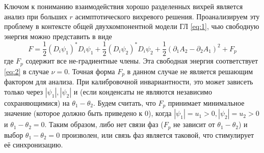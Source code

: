 Ключом к пониманию взаимодействия хорошо разделенных вихрей является анализ 
при больших \( r \) асимптотического вихревого решения. Проанализируем эту 
проблему в контексте общей двухкомпонентной модели ГЛ \eqref{eq:1}, чью 
свободную энергия можно представить в виде
\begin{equation}
    F = \frac{1}{2}\left( D_i \psi_1 \right)^{*} D_i \psi_1 + 
        \frac{1}{2}\left( D_i \psi_2 \right)^{*} D_i \psi_2 + 
        \frac{1}{2}\left( \partial_1 A_2 - \partial_2 A_1 \right)^2 + F_p
    \label{eq:3}
\end{equation}
где \( F_p \) содержит все не-градиентные члены. Эта свободная энергия 
соответствует \eqref{eq:2} в случае \( \nu = 0 \). Точная форма \( F_p \) в 
данном случае не является решающим фактором для анализа. При калибровочной 
инвариантности, это может зависеть только через \( |\psi_1|, |\psi_2| \) и 
(если конденсаты не являются независимо сохраняющимися) на 
\( \theta_1 - \theta_2 \). Будем считать, что \( F_p \) принимает минимальное 
значение (которое должно быть приведено к 0), когда 
\( |\psi_1| = u_1 > 0, |\psi_2| = u_2 > 0 \) и \( \theta_1 - \theta_2 = 0 \).
Таким образом, либо нет связи фаз (\( F_p \) не зависит от 
\( \theta_1 - \theta_2 \)) и выбор \( \theta_1 - \theta_2 = 0 \) произволен, 
или связь фаз является таковой, что стимулирует её синхронизацию. 

